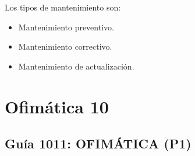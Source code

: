 \documentclass[letterpaper,10pt,spanish]{sphinxmanual}
\begin{document}
\sphinxAtStartPar
Los tipos de mantenimiento son:
\begin{itemize}
\item {} 
\sphinxAtStartPar
Mantenimiento preventivo.

\item {} 
\sphinxAtStartPar
Mantenimiento correctivo.

\item {} 
\sphinxAtStartPar
Mantenimiento de actualización.

\end{itemize}

\sphinxstepscope


\chapter{Ofimática 10}
\label{\detokenize{1_guias/10ofimatica/G1010:ofimatica-10}}\label{\detokenize{1_guias/10ofimatica/G1010::doc}}
\sphinxstepscope


\section{Guía 1011: OFIMÁTICA (P1)}
\label{\detokenize{1_guias/10ofimatica/G1011:guia-1011-ofimatica-p1}}\label{\detokenize{1_guias/10ofimatica/G1011::doc}}
\end{document}
